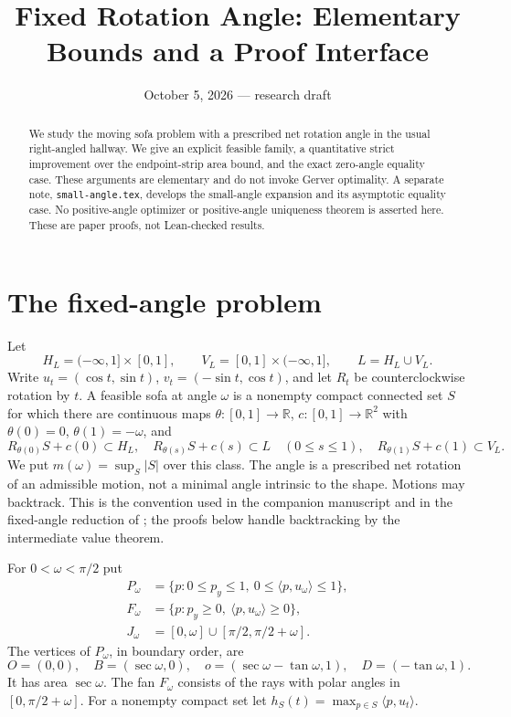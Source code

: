 \documentclass[11pt]{article}
\title{Fixed Rotation Angle: Elementary Bounds and a Proof Interface}
\author{}
\date{October 5, 2026 --- research draft}
\theoremstyle{remark}\newtheorem{remark}[theorem]{Remark}
\newcommand{\R}{\mathbb R}
\newcommand{\area}[1]{\lvert #1\rvert}
\newcommand{\ip}[2]{\langle #1,#2\rangle}
\begin{document}
\maketitle
\begin{abstract}
We study the moving sofa problem with a prescribed net rotation angle in the usual right-angled hallway. We give an explicit feasible family, a quantitative strict improvement over the endpoint-strip area bound, and the exact zero-angle equality case. These arguments are elementary and do not invoke Gerver optimality. A separate note, \texttt{small-angle.tex}, develops the small-angle expansion and its asymptotic equality case. No positive-angle optimizer or positive-angle uniqueness theorem is asserted here. These are paper proofs, not Lean-checked results.
\end{abstract}

\section{The fixed-angle problem}
Let
\[
 H_L=(-\infty,1]\times[0,1],\qquad V_L=[0,1]\times(-\infty,1],\qquad L=H_L\cup V_L.
\]
Write $u_t=(\cos t,\sin t)$, $v_t=(-\sin t,\cos t)$, and let $R_t$ be counterclockwise rotation by $t$.
A feasible sofa at angle $\omega$ is a nonempty compact connected set $S$ for which there are continuous maps $\theta:[0,1]\to\R$, $c:[0,1]\to\R^2$ with $\theta(0)=0$, $\theta(1)=-\omega$, and
\[
 R_{\theta(0)}S+c(0)\subset H_L,\quad R_{\theta(s)}S+c(s)\subset L\quad(0\le s\le1),\quad R_{\theta(1)}S+c(1)\subset V_L.
\]
We put $m(\omega)=\sup_S\area S$ over this class. The angle is a prescribed net rotation of an admissible motion, not a minimal angle intrinsic to the shape. Motions may backtrack. This is the convention used in the companion manuscript and in the fixed-angle reduction of \cite{Baek}; the proofs below handle backtracking by the intermediate value theorem.

For $0<\omega<\pi/2$ put
\begin{align*}
 P_\omega&=\{p:0\le p_y\le1,\ 0\le\ip p{u_\omega}\le1\},\\
 F_\omega&=\{p:p_y\ge0,\ \ip p{u_\omega}\ge0\},\\
 J_\omega&=[0,\omega]\cup[\pi/2,\pi/2+\omega].
\end{align*}
The vertices of $P_\omega$, in boundary order, are
\[
 O=(0,0),\quad B=(\sec\omega,0),\quad o=(\sec\omega-\tan\omega,1),\quad D=(-\tan\omega,1).
\]
It has area $\sec\omega$. The fan $F_\omega$ consists of the rays with polar angles in $[0,\pi/2+\omega]$.
For a nonempty compact set let $h_S(t)=\max_{p\in S}\ip p{u_t}$.
\end{document}

